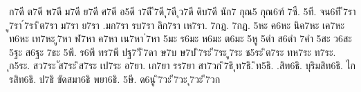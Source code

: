 {%
ก7ดี
ต7ดี
พ7ดี
ม7ดี
ย7ดี
ศ7ดี
อ5ดี
า7ดี
ี7ดี
ุ7ดี
ุว7ดี
ดิบ7ดี
นัก7
กุณ5
กุณ6ฑ์
7ซี.
5ที.
จน6ที
ี7รา
ู7รา
์7รา
ิต7รา
ม7รา
ย7รา
.มก7รา
รบ7รา
ลิก7รา
เห7รา.
7กฎ.
7กฏ.
5หะ
ค6หะ
นิค7หะ
เค7หะ
ท6หะ
เท7หะ
ู7หา
ฬ7หา
ค7หา
เน7หา
่7หา
5มะ
ร6มะ
ห6มะ
ต6มะ
5หู
5ดำ
ส6ดำ
7คำ
5สะ
ว6สะ
5ฐะ
ส6ฐะ
7ธะ
5พี.
ร6พี
ทร7พี
ปฐ7วี
ิ7ดา
ษ7บ
ษ7ป
ิ7ระ
ี7ระ
ู7ระ
ช5ระ
ิต7ระ
ทห7ระ
ท7ระ.
ุก5ระ.
สว7ระ
ัส7ระ
ิส7ระ
เป7ระ
อ7ยา.
เก7ยา
รร7ยา
สา7วก
ิ7ธิ
ุท7ธิ.
ิท5ธิ.
.สิท6ธิ.
บุริมสิท6ธิ.
ไกรสิท6ธิ.
ป7ธิ
ขัดสมา6ธิ
พยา6ธิ.
5ษี.
ด6นู
ิ7วะ
ี7วะ
ุ7วะ
ี7วก
}
